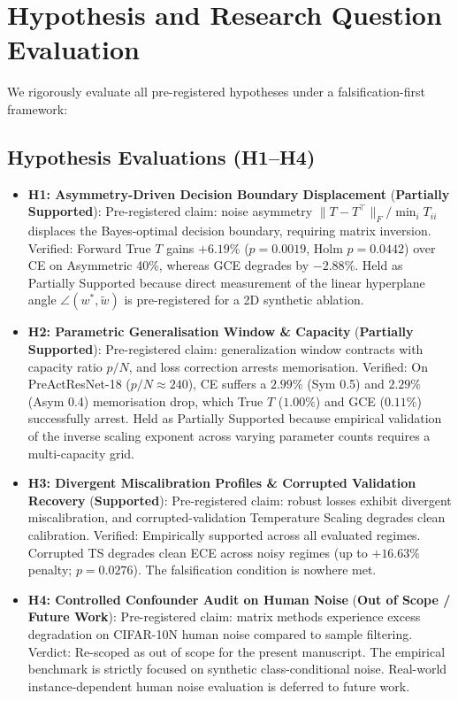 \documentclass[journal]{IEEEtran}
\theoremstyle{definition}
\begin{document}
\section{Hypothesis and Research Question Evaluation}



We rigorously evaluate all pre-registered hypotheses under a falsification-first framework:

\subsection{Hypothesis Evaluations (H1--H4)}
\begin{itemize}
    \item \textbf{H1: Asymmetry-Driven Decision Boundary Displacement} (\textbf{Partially Supported}): Pre-registered claim: noise asymmetry $\|T - T^\top\|_F / \min_i T_{ii}$ displaces the Bayes-optimal decision boundary, requiring matrix inversion. Verified: Forward True $T$ gains $+6.19\%$ ($p=0.0019$, Holm $p=0.0442$) over CE on Asymmetric 40\%, whereas GCE degrades by $-2.88\%$. Held as Partially Supported because direct measurement of the linear hyperplane angle $\angle(w^*, \tilde{w})$ is pre-registered for a 2D synthetic ablation.
    \item \textbf{H2: Parametric Generalisation Window \& Capacity} (\textbf{Partially Supported}): Pre-registered claim: generalization window contracts with capacity ratio $p/N$, and loss correction arrests memorisation. Verified: On PreActResNet-18 ($p/N \approx 240$), CE suffers a $2.99\%$ (Sym 0.5) and $2.29\%$ (Asym 0.4) memorisation drop, which True $T$ ($1.00\%$) and GCE ($0.11\%$) successfully arrest. Held as Partially Supported because empirical validation of the inverse scaling exponent across varying parameter counts requires a multi-capacity grid.
    \item \textbf{H3: Divergent Miscalibration Profiles \& Corrupted Validation Recovery} (\textbf{Supported}): Pre-registered claim: robust losses exhibit divergent miscalibration, and corrupted-validation Temperature Scaling degrades clean calibration. Verified: Empirically supported across all evaluated regimes. Corrupted TS degrades clean ECE across noisy regimes (up to $+16.63\%$ penalty; $p=0.0276$). The falsification condition is nowhere met.
    \item \textbf{H4: Controlled Confounder Audit on Human Noise} (\textbf{Out of Scope / Future Work}): Pre-registered claim: matrix methods experience excess degradation on CIFAR-10N human noise compared to sample filtering. Verdict: Re-scoped as out of scope for the present manuscript. The empirical benchmark is strictly focused on synthetic class-conditional noise. Real-world instance-dependent human noise evaluation is deferred to future work.
\end{itemize}
\end{document}
